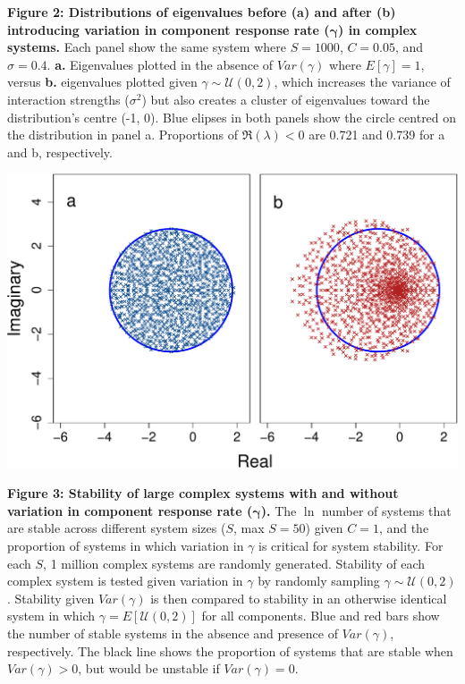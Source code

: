 \documentclass[]{article}
\begin{document}
\clearpage

\textbf{Figure 2: Distributions of eigenvalues before (a) and after (b)
introducing variation in component response rate
(\(\boldsymbol{\gamma}\)) in complex systems.} Each panel show the same
system where \(S = 1000\), \(C = 0.05\), and \(\sigma = 0.4\).
\textbf{a.} Eigenvalues plotted in the absence of \(Var(\gamma)\) where
\(E[\gamma] = 1\), versus \textbf{b.} eigenvalues plotted given
\(\gamma \sim \mathcal{U}(0, 2)\), which increases the variance of
interaction strengths (\(\sigma^{2}\)) but also creates a cluster of
eigenvalues toward the distribution's centre (-1, 0). Blue elipses in
both panels show the circle centred on the distribution in panel a.
Proportions of \(\Re(\lambda) < 0\) are 0.721 and 0.739 for a and b,
respectively.

\includegraphics{ms_files/figure-latex/unnamed-chunk-13-1.pdf}

\clearpage

\textbf{Figure 3: Stability of large complex systems with and without
variation in component response rate (\(\boldsymbol{\gamma}\)).} The
\(\ln\) number of systems that are stable across different system sizes
(\(S\), max \(S=50\)) given \(C = 1\), and the proportion of systems in
which variation in \(\gamma\) is critical for system stability. For each
\(S\), 1 million complex systems are randomly generated. Stability of
each complex system is tested given variation in \(\gamma\) by randomly
sampling \(\gamma \sim \mathcal{U}(0, 2)\). Stability given
\(Var(\gamma)\) is then compared to stability in an otherwise identical
system in which \(\gamma = E[\mathcal{U}(0, 2)]\) for all components.
Blue and red bars show the number of stable systems in the absence and
presence of \(Var(\gamma)\), respectively. The black line shows the
proportion of systems that are stable when \(Var(\gamma) > 0\), but
would be unstable if \(Var(\gamma) = 0\).
\end{document}
